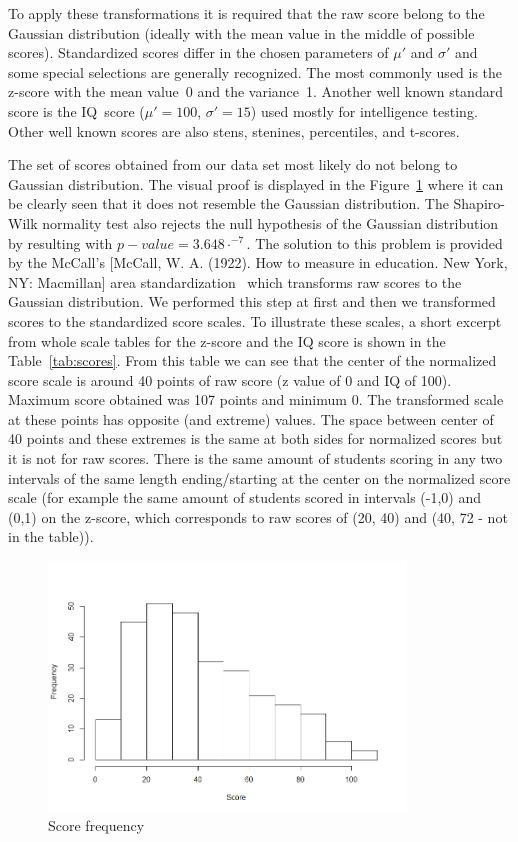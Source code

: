 To apply these transformations it is required that the raw score belong to the Gaussian distribution (ideally with the mean value in the middle of possible scores). Standardized scores differ in the chosen parameters of $\mu'$ and $\sigma'$ and some special selections are generally recognized. The most commonly used is the z-score with the mean value~0 and the variance~1. Another well known standard score is the IQ~score (${\mu' = 100}$, ${\sigma'=15}$) used mostly for intelligence testing. Other well known scores are also stens, stenines, percentiles, and t-scores.

The set of scores obtained from our data set most likely do not belong to Gaussian distribution. The visual proof is displayed in the Figure~\ref{pic:gauss} where it can be clearly seen that it does not resemble the Gaussian distribution. The Shapiro-Wilk normality test also rejects the null hypothesis of the Gaussian distribution by resulting with $p-value = 3.648\cdot^{-7}$. The solution to this problem is provided by the McCall’s [McCall, W. A. (1922). How to measure in education. New York, NY: Macmillan] area standardization~\cite{2011psychometrics} which transforms raw scores to the Gaussian distribution. We performed this step at first and then we transformed scores to the standardized score scales. To illustrate these scales, a short excerpt from whole scale tables for the z-score and the IQ score is shown in the Table~\ref{tab:scores}. From this table we can see that the center of the normalized score scale is around 40 points of raw score (z value of 0 and IQ of 100). Maximum score obtained was 107 points and minimum 0. The transformed scale at these points has opposite (and extreme) values. The space between center of 40 points and these extremes is the same at both sides for normalized scores but it is not for raw scores. There is the same amount of students scoring in any two intervals of the same length ending/starting at the center on the normalized score scale (for example the same amount of students scored in intervals (-1,0) and (0,1) on the z-score, which corresponds to raw scores of (20, 40) and (40, 72 - not in the table)).


\begin{figure}%
\begin{center}
\includegraphics[width=9.5cm]{obr/histogram.png}%
\caption{Score frequency}%
\label{pic:gauss}%
\end{center}
\end{figure}


